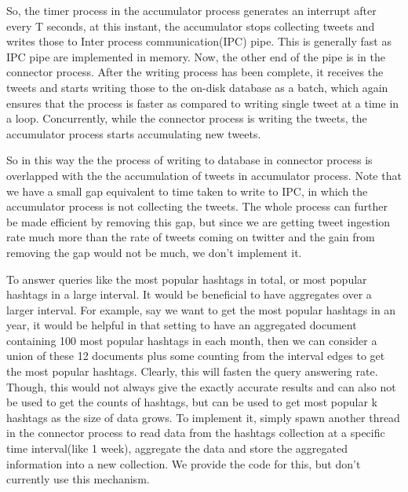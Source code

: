 \documentclass[letterpaper,10pt,english]{sphinxmanual}
\begin{document}
So, the timer process in the accumulator process generates an interrupt after every T seconds, at this instant, the accumulator stops collecting tweets and writes those to Inter process communication(IPC) pipe. This is generally fast as IPC pipe are implemented in memory. Now, the other end of the pipe is in the connector process. After the writing process has been complete, it receives the tweets and starts writing those to the on-disk database as a batch, which again ensures that the process is faster as compared to writing single tweet at a time in a loop. Concurrently, while the connector process is writing the tweets, the accumulator process starts accumulating new tweets.

So in this way the the process of writing to database in connector process is overlapped with the the accumulation of tweets in accumulator process. Note that we have a small gap equivalent to time taken to write to IPC, in which the accumulator process is not collecting the tweets. The whole process can further be made efficient by removing this gap, but since we are getting tweet ingestion rate much more than the rate of tweets coming on twitter and the gain from removing the gap would not be much, we don’t implement it.

To answer queries like the most popular hashtags in total, or most popular hashtags in a large interval. It would be beneficial to have aggregates over a larger interval. For example, say we want to get the most popular hashtags in an year, it would be helpful in that setting to have an aggregated document containing 100 most popular hashtags in each month, then we can consider a union of these 12 documents plus some counting from the interval edges to get the most popular hashtags. Clearly, this will fasten the query answering rate. Though, this would not always give the exactly accurate results and can also not be used to get the counts of hashtags, but can be used to get most popular k hashtags as the size of data grows. To implement it, simply spawn another thread in the connector process to read data from the hashtags collection at a specific time interval(like 1 week), aggregate the data and store the aggregated information into a new collection. We provide the code for this, but don’t currently use this mechanism.
\end{document}
